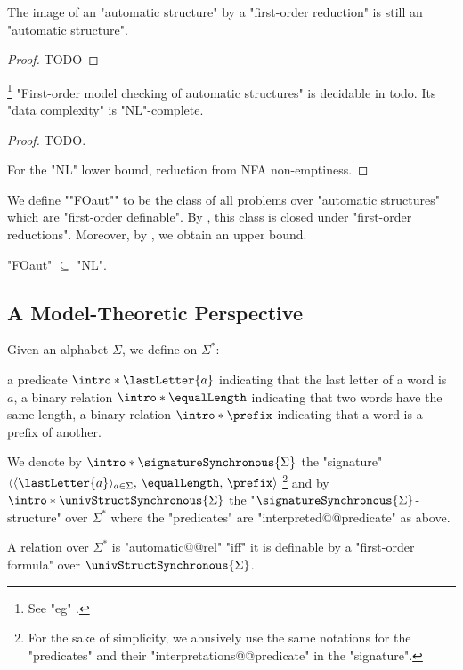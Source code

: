 \begin{proposition}[Folklore]
	\AP\label{prop:first-order-reduction-preserve-automaticity}
	The image of an "automatic structure" by a "first-order reduction" is
	still an "automatic structure".
\end{proposition}
\begin{proof}
	TODO
\end{proof}


\begin{proposition}
	\!\footnote{See "eg" \cite[Theorem XII.1.7]{Blumensath2024MSOModelTheory}.}
	\label{prop:first-order-model-checking-automatic-structures}
	"First-order model checking of automatic structures" is decidable in todo.
	Its "data complexity" is "NL"-complete.
\end{proposition}

\begin{proof}
	TODO.

	For the "NL" lower bound, reduction from NFA non-emptiness.
\end{proof}

We define \AP""FOaut"" to be the class of all problems over "automatic structures"
which are "first-order definable". By ,
this class is closed under "first-order reductions". Moreover,
by , we obtain an upper bound.

\begin{proposition}
	"FOaut" $\subseteq$ "NL".
\end{proposition}


\subsection{A Model-Theoretic Perspective}

Given an alphabet $\Sigma$, we define on $\Sigma^*$:
\begin{itemize}
	\itemAP a predicate $\intro*\lastLetter{a}$ indicating that the last letter of a word is $a$,
	\itemAP a binary relation $\intro*\equalLength$ indicating that two words have the same length,
	\itemAP a binary relation $\intro*\prefix$ indicating that a word is a prefix of another.
\end{itemize} 
We denote by $\intro*\signatureSynchronous{\Sigma}$ the "signature" $\langle \langle\lastLetter{a}\rangle_{a \in \Sigma},\, \equalLength,\, \prefix \rangle$%
\footnote{For the sake of simplicity, we abusively use the same notations for
the "predicates" and their "interpretations@@predicate" in the "signature".} and
by \AP$\intro*\univStructSynchronous{\Sigma}$ the "$\signatureSynchronous{\Sigma}$-structure" over $\Sigma^*$ where
the "predicates" are "interpreted@@predicate" as above.

\begin{proposition}
	\label{prop:automatic-first-order}
	A relation over $\Sigma^*$ is "automatic@@rel" "iff" it is definable by a "first-order formula" over \(\univStructSynchronous{\Sigma}\).
\end{proposition}
